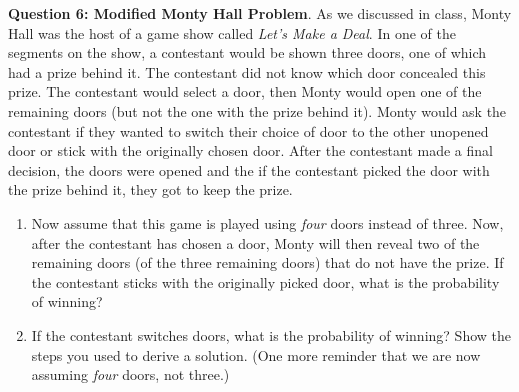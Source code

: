 \documentclass[10pt]{amsart}
\begin{document}
\noindent \textbf{Question 6: Modified Monty Hall Problem}. As we discussed in class, Monty Hall was the host of a game show called \textit{Let's Make a Deal}. In one of the segments on the show, a contestant would be shown three doors, one of which had a prize behind it. The contestant did not know which door concealed this prize. The contestant would select a door, then Monty would open one of the remaining doors (but not the one with the prize behind it). Monty would ask the contestant if they wanted to switch their choice of door to the other unopened door or stick with the originally chosen door. After the contestant made a final decision, the doors were opened and the if the contestant picked the door with the prize behind it, they got to keep the prize.
\begin{enumerate}
\item Now assume that this game is played using {\it four} doors instead of three. Now, after the contestant has chosen a door, Monty will then reveal two of the remaining doors (of the three remaining doors) that do not have the prize. If the contestant sticks with the originally picked door, what is the probability of winning?
\item If the contestant switches doors, what is the probability of winning? Show the steps you used to derive a solution. (One more reminder that we are now assuming {\it four} doors, not three.)
\end{enumerate}
\end{document}
